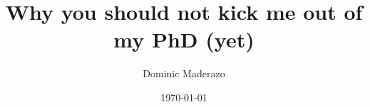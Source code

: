\documentclass{beamer}
\title[]{Why you should not kick me out of my PhD (yet)} %
\author{Dominic Maderazo} %
{
\medskip
}
\date{\today} %
\begin{document}
    \begin{frame}
        \titlepage 
    \end{frame}
    
        
    
                        
    
\end{document}
